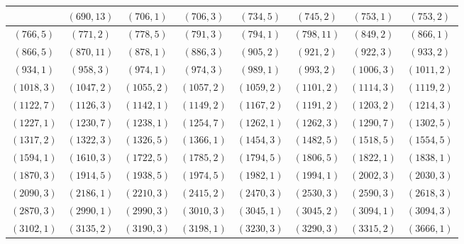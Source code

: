 \documentclass[11pt,reqno]{amsart}
\theoremstyle{definition}
\begin{document}
\begin{longtable}{|c|c|c|c|c|c|c|c|}
 & 
$ ( 690 , 13 )$
 & 
$ ( 706 , 1 )$
 & 
$ ( 706 , 3 )$
 & 
$ ( 734 , 5 )$
 & 
$ ( 745 , 2 )$
 & 
$ ( 753 , 1 )$
 & 
$ ( 753 , 2 )$
\\ \hline
$ ( 766 , 5 )$
 & 
$ ( 771 , 2 )$
 & 
$ ( 778 , 5 )$
 & 
$ ( 791 , 3 )$
 & 
$ ( 794 , 1 )$
 & 
$ ( 798 , 11 )$
 & 
$ ( 849 , 2 )$
 & 
$ ( 866 , 1 )$
\\ \hline
$ ( 866 , 5 )$
 & 
$ ( 870 , 11 )$
 & 
$ ( 878 , 1 )$
 & 
$ ( 886 , 3 )$
 & 
$ ( 905 , 2 )$
 & 
$ ( 921 , 2 )$
 & 
$ ( 922 , 3 )$
 & 
$ ( 933 , 2 )$
\\ \hline
$ ( 934 , 1 )$
 & 
$ ( 958 , 3 )$
 & 
$ ( 974 , 1 )$
 & 
$ ( 974 , 3 )$
 & 
$ ( 989 , 1 )$
 & 
$ ( 993 , 2 )$
 & 
$ ( 1006 , 3 )$
 & 
$ ( 1011 , 2 )$
\\ \hline
$ ( 1018 , 3 )$
 & 
$ ( 1047 , 2 )$
 & 
$ ( 1055 , 2 )$
 & 
$ ( 1057 , 2 )$
 & 
$ ( 1059 , 2 )$
 & 
$ ( 1101 , 2 )$
 & 
$ ( 1114 , 3 )$
 & 
$ ( 1119 , 2 )$
\\ \hline
$ ( 1122 , 7 )$
 & 
$ ( 1126 , 3 )$
 & 
$ ( 1142 , 1 )$
 & 
$ ( 1149 , 2 )$
 & 
$ ( 1167 , 2 )$
 & 
$ ( 1191 , 2 )$
 & 
$ ( 1203 , 2 )$
 & 
$ ( 1214 , 3 )$
\\ \hline
$ ( 1227 , 1 )$
 & 
$ ( 1230 , 7 )$
 & 
$ ( 1238 , 1 )$
 & 
$ ( 1254 , 7 )$
 & 
$ ( 1262 , 1 )$
 & 
$ ( 1262 , 3 )$
 & 
$ ( 1290 , 7 )$
 & 
$ ( 1302 , 5 )$
\\ \hline
$ ( 1317 , 2 )$
 & 
$ ( 1322 , 3 )$
 & 
$ ( 1326 , 5 )$
 & 
$ ( 1366 , 1 )$
 & 
$ ( 1454 , 3 )$
 & 
$ ( 1482 , 5 )$
 & 
$ ( 1518 , 5 )$
 & 
$ ( 1554 , 5 )$
\\ \hline
$ ( 1594 , 1 )$
 & 
$ ( 1610 , 3 )$
 & 
$ ( 1722 , 5 )$
 & 
$ ( 1785 , 2 )$
 & 
$ ( 1794 , 5 )$
 & 
$ ( 1806 , 5 )$
 & 
$ ( 1822 , 1 )$
 & 
$ ( 1838 , 1 )$
\\ \hline
$ ( 1870 , 3 )$
 & 
$ ( 1914 , 5 )$
 & 
$ ( 1938 , 5 )$
 & 
$ ( 1974 , 5 )$
 & 
$ ( 1982 , 1 )$
 & 
$ ( 1994 , 1 )$
 & 
$ ( 2002 , 3 )$
 & 
$ ( 2030 , 3 )$
\\ \hline
$ ( 2090 , 3 )$
 & 
$ ( 2186 , 1 )$
 & 
$ ( 2210 , 3 )$
 & 
$ ( 2415 , 2 )$
 & 
$ ( 2470 , 3 )$
 & 
$ ( 2530 , 3 )$
 & 
$ ( 2590 , 3 )$
 & 
$ ( 2618 , 3 )$
\\ \hline
$ ( 2870 , 3 )$
 & 
$ ( 2990 , 1 )$
 & 
$ ( 2990 , 3 )$
 & 
$ ( 3010 , 3 )$
 & 
$ ( 3045 , 1 )$
 & 
$ ( 3045 , 2 )$
 & 
$ ( 3094 , 1 )$
 & 
$ ( 3094 , 3 )$
\\ \hline
$ ( 3102 , 1 )$
 & 
$ ( 3135 , 2 )$
 & 
$ ( 3190 , 3 )$
 & 
$ ( 3198 , 1 )$
 & 
$ ( 3230 , 3 )$
 & 
$ ( 3290 , 3 )$
 & 
$ ( 3315 , 2 )$
 & 
$ ( 3666 , 1 )$
\\ \hline

\end{longtable}
\end{document}
